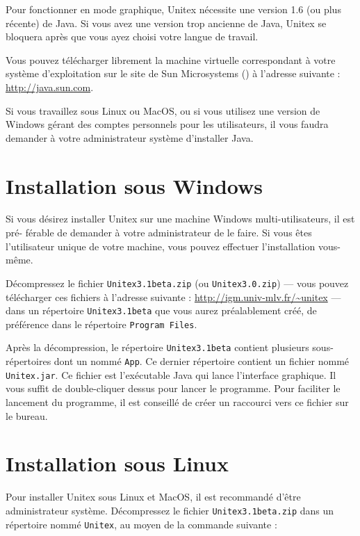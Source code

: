 \bigskip
\noindent Pour fonctionner en mode graphique, Unitex nécessite une version 1.6 (ou plus récente)
de Java. Si vous avez une version trop ancienne de Java, Unitex se bloquera après que vous
ayez choisi votre langue de travail.


\bigskip
\noindent Vous pouvez télécharger librement la machine virtuelle correspondant à votre 
système d’exploitation sur le site de Sun Microsystems (\cite{site-java}) à l’adresse suivante : 
\url{http://java.sun.com}.

\bigskip
\noindent Si vous travaillez sous Linux ou MacOS, ou si vous
utilisez une version de Windows gérant des comptes personnels pour les utilisateurs, il vous
faudra demander à votre administrateur système d’installer Java.



\section{Installation sous Windows}
    Si vous désirez installer Unitex sur une machine Windows multi-utilisateurs, il est pré-
férable de demander à votre administrateur de le faire. Si vous êtes l’utilisateur unique de
votre machine, vous pouvez effectuer l’installation vous-même.

\bigskip
\noindent Décompressez le fichier  \verb+Unitex3.1beta.zip+ (ou \verb+Unitex3.0.zip+)
--- vous pouvez télécharger ces fichiers à l’adresse suivante : \url{http://igm.univ-mlv.fr/~unitex} ---
dans un répertoire \verb+Unitex3.1beta+ que vous aurez préalablement créé, de préférence dans le répertoire  \verb+Program Files+.

\bigskip
\noindent Après la décompression, le répertoire \verb+Unitex3.1beta+ contient plusieurs
sous-répertoires dont un nommé \verb+App+. Ce dernier répertoire contient un fichier nommé
\verb+Unitex.jar+.                                                            Ce fichier est l’exécutable Java qui lance l’interface graphique. Il vous suffit de double-cliquer
dessus pour lancer le programme.
Pour faciliter le lancement du programme, il est conseillé de créer un raccourci vers ce fichier sur le bureau.


\section{Installation sous Linux}
Pour installer Unitex sous Linux et MacOS, il est recommandé d’être administrateur système. Décompressez le fichier \verb+Unitex3.1beta.zip+ dans un répertoire nommé
\verb+Unitex+, au moyen de la commande suivante :


